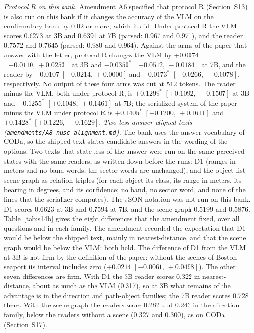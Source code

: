 \documentclass[10pt]{article}
\begin{document}
\emph{Protocol R on this bank.} Amendment A6 specified that protocol R (Section~S13) is also run on this bank if it changes the accuracy of the VLM on the confirmatory bank by $0.02$ or more, which it did. Under protocol R the VLM scores 0.6273 at 3B and 0.6391 at 7B (parsed: 0.967 and 0.971), and the reader 0.7572 and 0.7645 (parsed: 0.980 and 0.964). Against the arms of the paper that answer with the letter, protocol R changes the VLM by $+0.0074$ $[-0.0110,\,+0.0253]$ at 3B and $-0.0350^{*}$ $[-0.0512,\,-0.0184]$ at 7B, and the reader by $-0.0107$ $[-0.0214,\,+0.0000]$ and $-0.0173^{*}$ $[-0.0266,\,-0.0078]$, respectively. No output of these four arms was cut at 512 tokens. The reader minus the VLM, both under protocol R, is $+0.1299^{*}$ $[+0.1092,\,+0.1507]$ at 3B and $+0.1255^{*}$ $[+0.1048,\,+0.1461]$ at 7B; the serialized system of the paper minus the VLM under protocol R is $+0.1405^{*}$ $[+0.1200,\,+0.1611]$ and $+0.1428^{*}$ $[+0.1226,\,+0.1629]$.
\clearpage
\emph{Two less answer-aligned texts (\texttt{amendments/A8\_nusc\_alignment.md}).} The bank uses the answer vocabulary of CODa, so the shipped text states candidate answers in the wording of the options. Two texts that state less of the answer were run on the same perceived states with the same readers, as written down before the runs: D1 (ranges in meters and no band words; the sector words are unchanged), and the object-list scene graph as relation triples (for each object its class, its range in meters, its bearing in degrees, and its confidence; no band, no sector word, and none of the lines that the serializer computes). The JSON notation was not run on this bank. D1 scores 0.6623 at 3B and 0.7594 at 7B, and the scene graph 0.5199 and 0.5876. Table~\ref{tab:s14b} gives the eight differences that the amendment fixed, over all questions and in each family. The amendment recorded the expectation that D1 would be below the shipped text, mainly in nearest-distance, and that the scene graph would be below the VLM; both hold. The difference of D1 from the VLM at 3B is not firm by the definition of the paper: without the scenes of Boston seaport its interval includes zero ($+0.0214$ $[-0.0061,\,+0.0498]$). The other seven differences are firm. With D1 the 3B reader scores 0.322 in nearest-distance, about as much as the VLM (0.317), so at 3B what remains of the advantage is in the direction and path-object families; the 7B reader scores 0.728 there. With the scene graph the readers score 0.282 and 0.243 in the direction family, below the readers without a scene (0.327 and 0.300), as on CODa (Section~S17).
\end{document}
